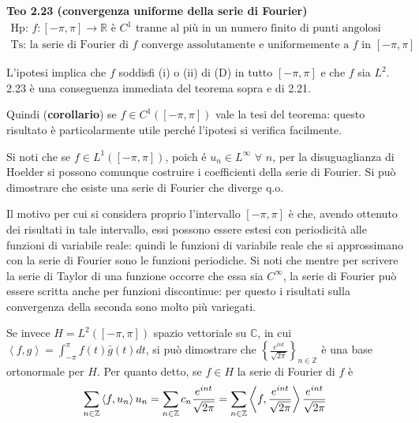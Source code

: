 \documentclass{article}
\begin{document}
\textbf{Teo 2.23 (convergenza uniforme della serie di Fourier)}%
\begin{gather*}
\text{Hp: }f:\left[ -\pi ,\pi \right] \rightarrow 
\mathbb{R}
\text{ \`{e} }C^{1}\text{ tranne al pi\`{u} in un numero finito di punti
angolosi} \\
\text{Ts: la serie di Fourier di }f\text{ converge assolutamente e
uniformemente a }f\text{ in }\left[ -\pi ,\pi \right]
\end{gather*}

L'ipotesi implica che $f$ soddisfi (i) o (ii) di (D) in tutto $\left[ -\pi
,\pi \right] $ e che $f$ sia $L^{2}$. 2.23 \`{e} una conseguenza immediata
del teorema sopra e di 2.21.

Quindi (\textbf{corollario}) se $f\in C^{1}\left( \left[ -\pi ,\pi \right]
\right) $ vale la tesi del teorema: questo risultato \`{e} particolarmente
utile perch\'{e} l'ipotesi si verifica facilmente.

Si noti che se $f\in L^{1}\left( \left[ -\pi ,\pi \right] \right) $, poich%
\'{e} $u_{n}\in L^{\infty }$ $\forall $ $n$, per la disuguaglianza di
Hoelder si possono comunque costruire i coefficienti della serie di Fourier.
Si pu\`{o} dimostrare che esiste una serie di Fourier che diverge q.o. 

Il motivo per cui si considera proprio l'intervallo $\left[ -\pi ,\pi \right]
$ \`{e} che, avendo ottenuto dei risultati in tale intervallo, essi possono
essere estesi con periodicit\`{a} alle funzioni di variabile reale: quindi
le funzioni di variabile reale che si approssimano con la serie di Fourier
sono le funzioni periodiche. Si noti che mentre per scrivere la serie di
Taylor di una funzione occorre che essa sia $C^{\infty }$, la serie di
Fourier pu\`{o} essere scritta anche per funzioni discontinue: per questo i
risultati sulla convergenza della seconda sono molto pi\`{u} variegati.

Se invece $H=L^{2}\left( \left[ -\pi ,\pi \right] \right) $ spazio
vettoriale su $%
\mathbb{C}
$, in cui $\left\langle f,g\right\rangle =\int_{-\pi }^{\pi }f\left(
t\right) \bar{g}\left( t\right) dt$, si pu\`{o} dimostrare che $\left\{ 
\frac{e^{int}}{\sqrt{2\pi }}\right\} _{n\in 
\mathbb{Z}
}$ \`{e} una base ortonormale per $H$. Per quanto detto, se $f\in H$ la
serie di Fourier di $f$ \`{e}%
\begin{equation*}
\sum_{n\in 
\mathbb{Z}
}\left\langle f,u_{n}\right\rangle u_{n}=\sum_{n\in 
\mathbb{Z}
}c_{n}\frac{e^{int}}{\sqrt{2\pi }}=\sum_{n\in 
\mathbb{Z}
}\left\langle f,\frac{e^{int}}{\sqrt{2\pi }}\right\rangle \frac{e^{int}}{%
\sqrt{2\pi }}
\end{equation*}
\end{document}
